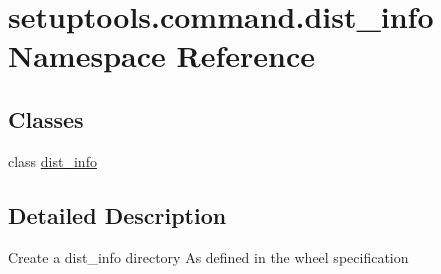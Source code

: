 \hypertarget{namespacesetuptools_1_1command_1_1dist__info}{}\section{setuptools.\+command.\+dist\+\_\+info Namespace Reference}
\label{namespacesetuptools_1_1command_1_1dist__info}
\subsection*{Classes}
\begin{DoxyCompactItemize}
\item 
class \hyperlink{classsetuptools_1_1command_1_1dist__info_1_1dist__info}{dist\+\_\+info}
\end{DoxyCompactItemize}


\subsection{Detailed Description}
\begin{DoxyVerb}Create a dist_info directory
As defined in the wheel specification
\end{DoxyVerb}
 